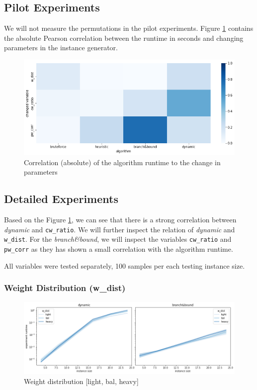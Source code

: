 \documentclass[a4paper,10pt]{article}
\begin{document}
\subsection{Pilot Experiments}

 We will not measure the permutations in the pilot experiments. Figure \ref{pilot_figure} contains the absolute Pearson correlation between the runtime in seconds and changing parameters in the instance generator.

\begin{figure}[!htb]
	\centering
  	\includegraphics[width=\textwidth]{images/pilot.png}
	\caption{Correlation (absolute) of the algorithm runtime to the change in parameters}
	\label{pilot_figure}
\end{figure}

\subsection{Detailed Experiments}

Based on the Figure \ref{pilot_figure}, we can see that there is a strong correlation between \emph{dynamic} and \lstinline{cw_ratio}. We will further inspect the relation of \emph{dynamic} and \lstinline{w_dist}. For the \emph{branch\&bound}, we will inspect the variables \lstinline{cw_ratio} and \lstinline{pw_corr} as they has shown a small correlation with the algorithm runtime.

All variables were tested separately, 100 samples per each testing instance size.

\subsubsection{Weight Distribution (w\_dist)}

\begin{figure}[!htb]
	\centering
  	\includegraphics[width=\textwidth]{images/wdist.png}
	\caption{Weight distribution [light, bal, heavy]}
	\label{wdist}
\end{figure}
\end{document}
